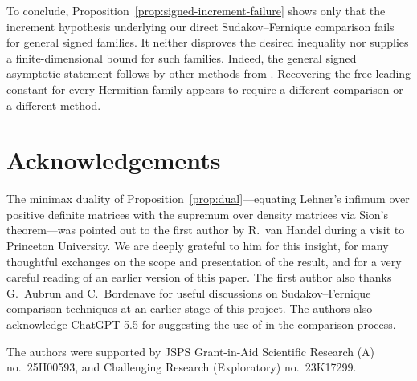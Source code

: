\documentclass{article}
\begin{document}
To conclude, Proposition~\ref{prop:signed-increment-failure} shows only that the
increment hypothesis underlying our direct Sudakov--Fernique comparison fails
for general signed families.  It neither disproves the desired inequality nor
supplies a finite-dimensional bound for such families.  Indeed, the general
signed asymptotic statement follows by other methods from
\cite{CGVvHClassical}.  Recovering the free leading constant for every
Hermitian family appears to require a different comparison or a different
method.

\section*{Acknowledgements}

The minimax duality of Proposition~\ref{prop:dual}---equating Lehner's infimum
over positive definite matrices with the supremum over density matrices via
Sion's theorem---was pointed out to the first author by R.~van Handel during a
visit to Princeton University.  We are deeply grateful to him for this insight,
for many thoughtful exchanges on the scope and presentation of the result, and
for a very careful reading of an earlier version of this paper.
The first author also thanks G.~Aubrun and C.~Bordenave for useful discussions on Sudakov--Fernique comparison techniques at an earlier stage of this project.
The authors also acknowledge ChatGPT 5.5 for suggesting the use of
\cite{ArakiYamagami1981} in the comparison process.

The authors were supported by JSPS Grant-in-Aid Scientific Research (A)
no.~25H00593, and Challenging Research (Exploratory) no.~23K17299.



\end{document}
